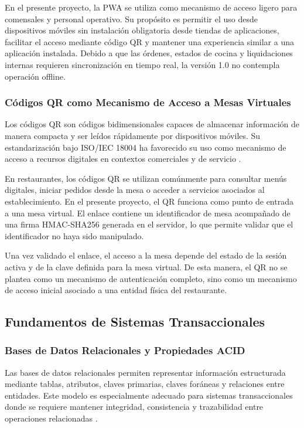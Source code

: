 En el presente proyecto, la PWA se utiliza como mecanismo de acceso ligero para comensales
y personal operativo. Su propósito es permitir el uso desde dispositivos móviles sin
instalación obligatoria desde tiendas de aplicaciones, facilitar el acceso mediante código QR
y mantener una experiencia similar a una aplicación instalada. Debido a que las órdenes,
estados de cocina y liquidaciones internas requieren sincronización en tiempo real, la
versión 1.0 no contempla operación offline.

\subsubsection{Códigos QR como Mecanismo de Acceso a Mesas Virtuales}

Los códigos QR son códigos bidimensionales capaces de almacenar información de manera
compacta y ser leídos rápidamente por dispositivos móviles. Su estandarización bajo
ISO/IEC 18004 ha favorecido su uso como mecanismo de acceso a recursos digitales en
contextos comerciales y de servicio \cite{denso_qr_standards}.

En restaurantes, los códigos QR se utilizan comúnmente para consultar menús digitales,
iniciar pedidos desde la mesa o acceder a servicios asociados al establecimiento. En el
presente proyecto, el QR funciona como punto de entrada a una mesa virtual. El enlace
contiene un identificador de mesa acompañado de una firma HMAC-SHA256 generada en el
servidor, lo que permite validar que el identificador no haya sido manipulado.

Una vez validado el enlace, el acceso a la mesa depende del estado de la sesión activa y
de la clave definida para la mesa virtual. De esta manera, el QR no se plantea como un
mecanismo de autenticación completo, sino como un mecanismo de acceso inicial asociado a
una entidad física del restaurante.

\subsection{Fundamentos de Sistemas Transaccionales}

\subsubsection{Bases de Datos Relacionales y Propiedades ACID}

Las bases de datos relacionales permiten representar información estructurada mediante
tablas, atributos, claves primarias, claves foráneas y relaciones entre entidades. Este
modelo es especialmente adecuado para sistemas transaccionales donde se requiere mantener
integridad, consistencia y trazabilidad entre operaciones relacionadas \cite{ibm_relational_db}.

